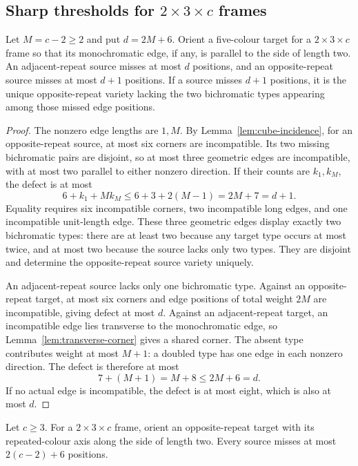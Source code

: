 \subsection[Sharp thresholds for 2 by 3 by c frames]{Sharp thresholds for $2\times3\times c$ frames}

\begin{lemma}\label{lem:23c-compatibility}
Let $M=c-2\ge2$ and put $d=2M+6$. Orient a five-colour target for
a $2\times3\times c$ frame so that its monochromatic edge, if any,
is parallel to the side of length two. An adjacent-repeat source misses
at most $d$ positions, and an opposite-repeat source misses at most
$d+1$ positions. If a source misses $d+1$ positions, it is the unique
opposite-repeat variety lacking the two bichromatic types appearing
among those missed edge positions.
\end{lemma}

\begin{proof}
The nonzero edge lengths are $1,M$. By Lemma~\ref{lem:cube-incidence},
for an opposite-repeat source,
at most six corners are incompatible. Its two missing bichromatic pairs
are disjoint, so at most three geometric edges are incompatible, with
at most two parallel to either nonzero direction. If their counts are
$k_1,k_M$, the defect is at most
\[
 6+k_1+Mk_M\le6+3+2(M-1)=2M+7=d+1.
\]
Equality requires six incompatible corners, two incompatible long
edges, and one incompatible unit-length edge. These three geometric
edges display exactly two bichromatic types: there are at least two
because any target type occurs at most twice, and at most two because
the source lacks only two types. They are disjoint and determine the
opposite-repeat source variety uniquely.

An adjacent-repeat source lacks only one bichromatic type. Against an
opposite-repeat target, at most six corners and edge positions of total
weight $2M$ are incompatible, giving defect at most $d$.
Against an adjacent-repeat target, an incompatible edge lies transverse
to the monochromatic edge, so Lemma~\ref{lem:transverse-corner}
gives a shared corner.
The absent type contributes weight at most $M+1$: a doubled type has
one edge in each nonzero direction. The defect is therefore at most
\[
 7+(M+1)=M+8\le2M+6=d.
\]
If no actual edge is incompatible, the defect is at most eight, which
is also at most $d$.
\end{proof}

\begin{lemma}
\label{lem:23c-opposite-short}
Let $c\ge3$. For a $2\times3\times c$ frame, orient an opposite-repeat target with
its repeated-colour axis along the side of length two. Every source
misses at most $2(c-2)+6$ positions.
\end{lemma}

